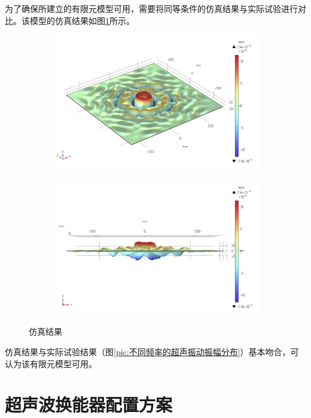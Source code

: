 \documentclass[fontset=windows,12pt,a4paper]{ctexart}
\begin{document}
为了确保所建立的有限元模型可用，需要将同等条件的仿真结果与实际试验进行对比。该模型的仿真结果如图\ref{pic:仿真结果}所示。

\begin{figure}[h]
  \centering
  \begin{subfigure}{0.45\textwidth}
    \includegraphics[width=\textwidth]{assets/result_600x600_proper_focus.png}
  \end{subfigure}
  \hfill
  \begin{subfigure}{0.45\textwidth}
    \includegraphics[width=\textwidth]{assets/result_600x600_side_focus.png}
  \end{subfigure}
  \caption{仿真结果}
  \label{pic:仿真结果}
\end{figure}

仿真结果与实际试验结果（图\ref{pic:不同频率的超声振动振幅分布}）基本吻合，可认为该有限元模型可用。

\section{超声波换能器配置方案}
\end{document}
